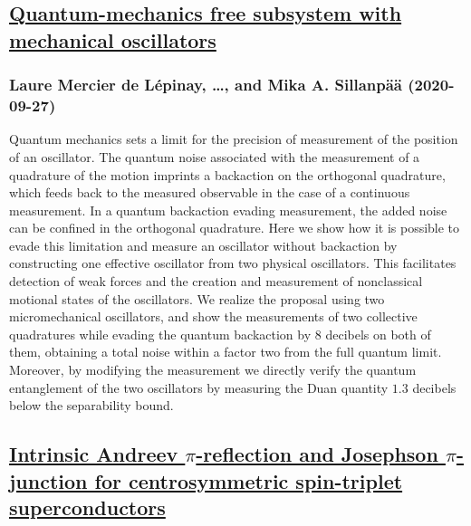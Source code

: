 \subsection*{\href{http://arxiv.org/abs/2009.12902v1}{Quantum-mechanics free subsystem with mechanical oscillators}}
\subsubsection*{Laure Mercier de Lépinay, \dots, and Mika A. Sillanpää (2020-09-27)}
Quantum mechanics sets a limit for the precision of measurement of the
position of an oscillator. The quantum noise associated with the measurement of
a quadrature of the motion imprints a backaction on the orthogonal quadrature,
which feeds back to the measured observable in the case of a continuous
measurement. In a quantum backaction evading measurement, the added noise can
be confined in the orthogonal quadrature. Here we show how it is possible to
evade this limitation and measure an oscillator without backaction by
constructing one effective oscillator from two physical oscillators. This
facilitates detection of weak forces and the creation and measurement of
nonclassical motional states of the oscillators. We realize the proposal using
two micromechanical oscillators, and show the measurements of two collective
quadratures while evading the quantum backaction by $8$ decibels on both of
them, obtaining a total noise within a factor two from the full quantum limit.
Moreover, by modifying the measurement we directly verify the quantum
entanglement of the two oscillators by measuring the Duan quantity $1.3$
decibels below the separability bound.

\subsection*{\href{http://arxiv.org/abs/2009.12891v1}{Intrinsic Andreev $π$-reflection and Josephson $π$-junction for  centrosymmetric spin-triplet superconductors}}
